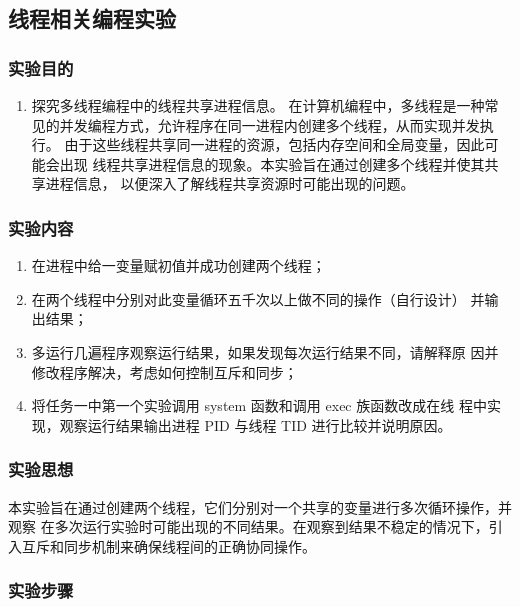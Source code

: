 \documentclass{article}
\begin{document}
    \subsection{线程相关编程实验}
    \subsubsection{实验目的}

    \begin{enumerate}
        \item 探究多线程编程中的线程共享进程信息。 在计算机编程中，多线程是一种常
        见的并发编程方式，允许程序在同一进程内创建多个线程，从而实现并发执行。
        由于这些线程共享同一进程的资源，包括内存空间和全局变量，因此可能会出现
        线程共享进程信息的现象。本实验旨在通过创建多个线程并使其共享进程信息，
        以便深入了解线程共享资源时可能出现的问题。
    \end{enumerate}

    \subsubsection{实验内容}

    \begin{enumerate}
        \item 在进程中给一变量赋初值并成功创建两个线程；
        \item 在两个线程中分别对此变量循环五千次以上做不同的操作（自行设计）
        并输出结果；
        \item 多运行几遍程序观察运行结果，如果发现每次运行结果不同，请解释原
        因并修改程序解决，考虑如何控制互斥和同步；
        \item 将任务一中第一个实验调用 system 函数和调用 exec 族函数改成在线
        程中实现，观察运行结果输出进程 PID 与线程 TID 进行比较并说明原因。
    \end{enumerate}


    \subsubsection{实验思想}

    本实验旨在通过创建两个线程，它们分别对一个共享的变量进行多次循环操作，并观察
    在多次运行实验时可能出现的不同结果。在观察到结果不稳定的情况下，引入互斥和同步机制来确保线程间的正确协同操作。

    \subsubsection{实验步骤}
\end{document}
